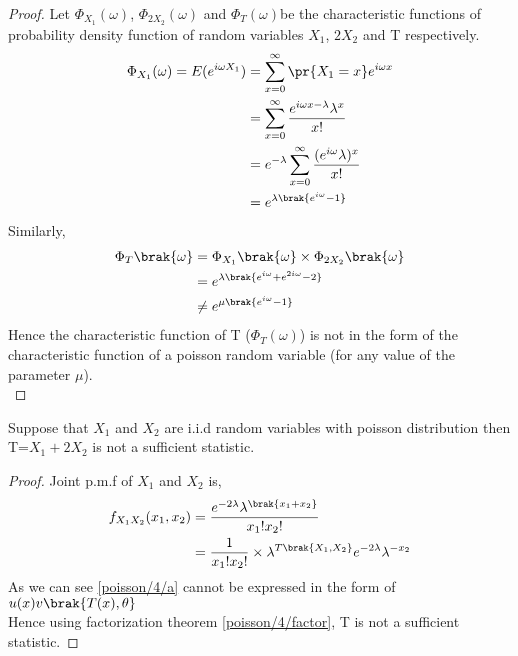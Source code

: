 \begin{proof}
Let $\Phi_{X_{1}}(\omega)$, $\Phi_{2X_{2}}(\omega)$ and  $\Phi_{T}(\omega)$be the characteristic functions of probability density function of random variables $X_{1}$, $2X_{2}$ and T respectively.\\
\begin{align}
    \Phi_{X_{1}}(\omega)=E(e^{i\omega X_{1}})&=\sum_{x=0}^{\infty}\pr{X_{1}=x}e^{i\omega x}\\
                    &=\sum_{x=0}^{\infty}\frac{e^{i\omega x-\lambda}\lambda^{x}}{x!}\\
                    &=e^{-\lambda}\sum_{x=0}^{\infty}\frac{(e^{i\omega}\lambda)^{x}}{x!}\\
                    &=e^{\lambda\brak{e^{i\omega}-1}}
\end{align}
Similarly,
                    \begin{align}
\Phi_{T}\brak{\omega}&=\Phi_{X_{1}}\brak{\omega}\times\Phi_{2X_{2}}\brak{\omega}\\
 &=e^{\lambda\brak{e^{i\omega}+e^{2i\omega}-2}}\\ 
 &\neq e^{\mu\brak{e^{i\omega}-1}}
 \end{align}
 Hence the characteristic function of T ($\Phi_{T}(\omega)$) is not in the form of the characteristic function of a poisson random variable (for any value of the parameter $\mu$).\\
 \end{proof}
 \begin{lemma}
 Suppose that $X_{1}$ and $X_{2}$ are i.i.d random variables with poisson distribution then T=$X_{1}+2X_{2}$ is not a sufficient statistic.
 \end{lemma}
 \begin{proof}
 Joint p.m.f of $X_{1}$ and $X_{2}$ is,
 \begin{align}
     f_{X_{1}X_{2}}(x_{1},x_{2})&=\frac{e^{-2\lambda}\lambda^{\brak{x_{1}+x_{2}}}}{x_{1}!x_{2}!}\label{poisson/4/a}\\
     &=\frac{1}{x_{1}!x_{2}!}\times\lambda^{T\brak{X_{1},X_{2}}}e^{-2\lambda}\lambda^{-x_{2}}
 \end{align}
 As we can see \eqref{poisson/4/a} cannot be expressed in the form of $u(x)v\brak{T(x), \theta}$\\
 Hence using factorization theorem \ref{poisson/4/factor}, T is not a sufficient statistic. 
 \end{proof}
